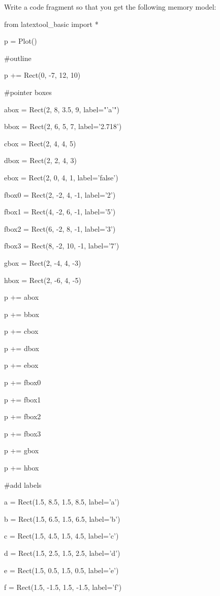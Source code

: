 Write a code fragment so that you get the following memory model:



\begin{python}

from latextool_basic import *

p = Plot()

#outline

p += Rect(0, -7, 12, 10)



#pointer boxes

abox = Rect(2, 8, 3.5, 9, label="'a'")

bbox = Rect(2, 6, 5, 7, label='2.718')

cbox = Rect(2, 4, 4, 5)

dbox = Rect(2, 2, 4, 3)

ebox = Rect(2, 0, 4, 1, label='false')

fbox0 = Rect(2, -2, 4, -1, label='2')

fbox1 = Rect(4, -2, 6, -1, label='5')

fbox2 = Rect(6, -2, 8, -1, label='3')

fbox3 = Rect(8, -2, 10, -1, label='7')

gbox = Rect(2, -4, 4, -3)

hbox = Rect(2, -6, 4, -5)



p += abox

p += bbox

p += cbox

p += dbox

p += ebox

p += fbox0

p += fbox1

p += fbox2

p += fbox3

p += gbox

p += hbox



#add labels

a = Rect(1.5, 8.5, 1.5, 8.5, label='a')

b = Rect(1.5, 6.5, 1.5, 6.5, label='b')

c = Rect(1.5, 4.5, 1.5, 4.5, label='c')

d = Rect(1.5, 2.5, 1.5, 2.5, label='d')

e = Rect(1.5, 0.5, 1.5, 0.5, label='e')

f = Rect(1.5, -1.5, 1.5, -1.5, label='f')


\end{python}

